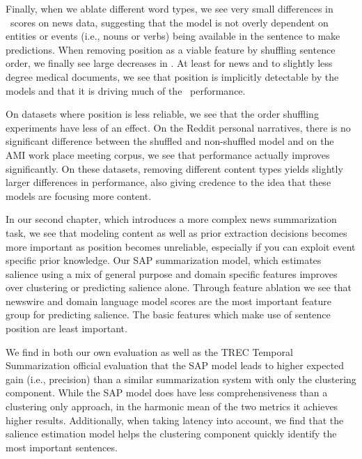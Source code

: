 Finally, when we ablate different word types, we see very small differences in
\rouge~scores on news data, suggesting that the model is not overly dependent
on entities or events (i.e., nouns or verbs) being available in the sentence
to make predictions. When removing position as a viable feature by shuffling
sentence order, we finally see large decreases in \rouge. At least for news
and to slightly less degree medical documents, we see that position is
implicitly detectable by the models and that it is driving much of the
\rouge~performance.

On datasets where position is less reliable, we see that the order shuffling
experiments have less of an effect. On the Reddit personal narratives, there
is no significant difference between the shuffled and non-shuffled model and
on the AMI work place meeting corpus, we see that performance actually
improves significantly. On these datasets, removing different content types
yields slightly larger differences in performance, also giving credence to the
idea that these models are focusing more content.

In our second chapter, which introduces a more complex news summarization
task, we see that modeling content as well as prior extraction decisions
becomes more important as position becomes unreliable, especially if you can
exploit event specific prior knowledge.  Our SAP summarization model, which
estimates salience using a mix of general purpose and domain specific features
improves over clustering or predicting salience alone.  Through feature
ablation we see that newswire and domain language model scores are the most
important feature group for predicting salience.  The basic features which
make use of sentence position are least important.

We find in both our own evaluation as well as the TREC Temporal Summarization
official evaluation that the SAP model leads to higher expected gain (i.e.,
precision) than a similar summarization system with only the clustering
component.  While the SAP model does have less comprehensiveness than a
clustering only approach, in the harmonic mean of the two metrics it achieves
higher results. Additionally, when taking latency into account, we find that
the salience estimation model helps the clustering component quickly identify
the most important sentences. 

